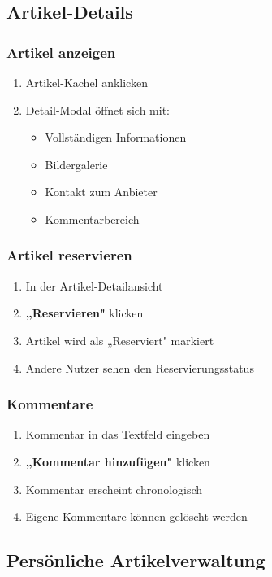 \documentclass[a4paper,12pt]{article}
\begin{document}
\subsection{Artikel-Details}

\subsubsection{Artikel anzeigen}
\begin{enumerate}
    \item Artikel-Kachel anklicken
    \item Detail-Modal öffnet sich mit:
    \begin{itemize}
        \item Vollständigen Informationen
        \item Bildergalerie
        \item Kontakt zum Anbieter
        \item Kommentarbereich
    \end{itemize}
\end{enumerate}

\subsubsection{Artikel reservieren}
\begin{enumerate}
    \item In der Artikel-Detailansicht
    \item \textbf{„Reservieren"} klicken
    \item Artikel wird als „Reserviert" markiert
    \item Andere Nutzer sehen den Reservierungsstatus
\end{enumerate}

\subsubsection{Kommentare}
\begin{enumerate}
    \item Kommentar in das Textfeld eingeben
    \item \textbf{„Kommentar hinzufügen"} klicken
    \item Kommentar erscheint chronologisch
    \item Eigene Kommentare können gelöscht werden
\end{enumerate}

\subsection{Persönliche Artikelverwaltung}
\end{document}
